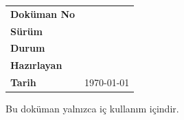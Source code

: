 \begin{titlepage}
  \thispagestyle{empty}
  \vspace*{2cm}
  {\small\docorg\par}
  \vspace{3cm}
  {\Huge\bfseries \doctitle\par}
  \vspace{0.6cm}
  {\Large \docsubtitle\par}
  \vspace{2cm}
  \begin{tabular}{@{}ll@{}}
    \textbf{Doküman No} & \docid{}      \\
    \textbf{Sürüm}      & \docversion{} \\
    \textbf{Durum}      & \docstatus{}  \\
    \textbf{Hazırlayan} & \docauthor{}  \\
    \textbf{Tarih}      & \today{}      \\
  \end{tabular}
  \vfill
  {\small Bu doküman yalnızca iç kullanım içindir.\par}
\end{titlepage}
